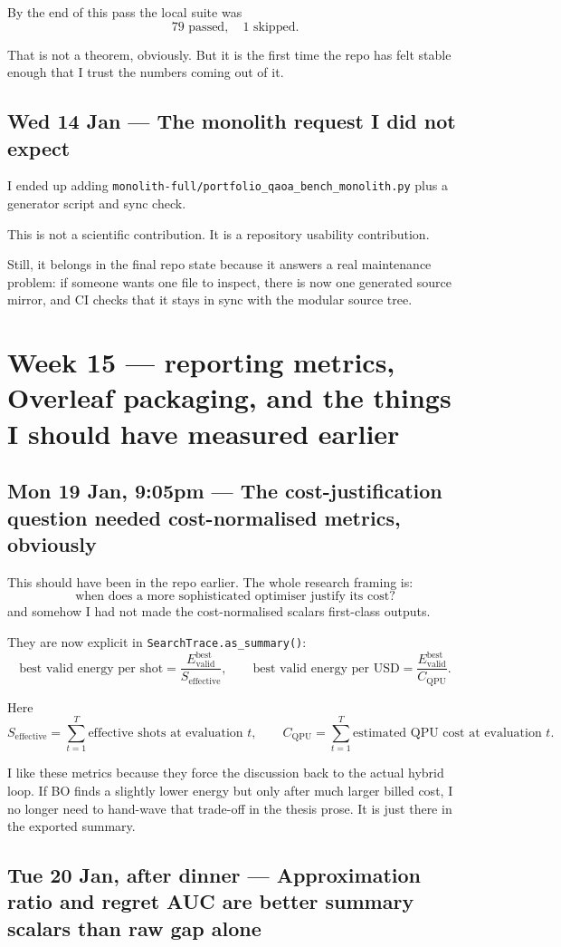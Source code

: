 \documentclass[11pt]{article}
\newcommand{\entry}[2]{\subsection*{#1 --- #2}}
\newcommand{\repo}[1]{\texttt{#1}}
\begin{document}
By the end of this pass the local suite was
\[
79 \text{ passed},\quad 1 \text{ skipped}.
\]

That is not a theorem, obviously.
But it is the first time the repo has felt stable enough that I trust the numbers coming out of it.

\entry{Wed 14 Jan}{The monolith request I did not expect}

I ended up adding \repo{monolith-full/portfolio\_qaoa\_bench\_monolith.py} plus a generator
script and sync check.

This is not a scientific contribution.
It is a repository usability contribution.

Still, it belongs in the final repo state because it answers a real maintenance problem:
if someone wants one file to inspect, there is now one generated source mirror, and CI checks that
it stays in sync with the modular source tree.

\section*{Week 15 --- reporting metrics, Overleaf packaging, and the things I should have measured earlier}

\entry{Mon 19 Jan, 9:05pm}{The cost-justification question needed cost-normalised metrics, obviously}

This should have been in the repo earlier.
The whole research framing is:
\[
\text{when does a more sophisticated optimiser justify its cost?}
\]
and somehow I had not made the cost-normalised scalars first-class outputs.

They are now explicit in \repo{SearchTrace.as\_summary()}:
\[
\text{best valid energy per shot}
=
\frac{E^{\text{best}}_{\text{valid}}}{S_{\text{effective}}},
\qquad
\text{best valid energy per USD}
=
\frac{E^{\text{best}}_{\text{valid}}}{C_{\text{QPU}}}.
\]

Here
\[
S_{\text{effective}}
=
\sum_{t=1}^{T} \text{effective shots at evaluation } t,
\qquad
C_{\text{QPU}}
=
\sum_{t=1}^{T} \text{estimated QPU cost at evaluation } t.
\]

I like these metrics because they force the discussion back to the actual hybrid loop.
If BO finds a slightly lower energy but only after much larger billed cost, I no longer need to
hand-wave that trade-off in the thesis prose.
It is just there in the exported summary.

\entry{Tue 20 Jan, after dinner}{Approximation ratio and regret AUC are better summary scalars than raw gap alone}
\end{document}
